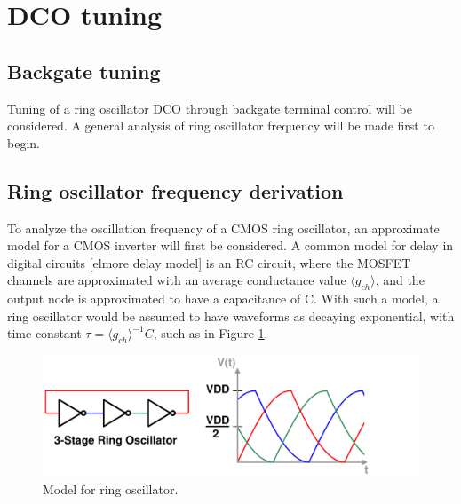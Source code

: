 	\FloatBarrier
	\flushleft
	\section{DCO tuning}
	\subsection{Backgate tuning}
		Tuning of a ring oscillator DCO through backgate terminal control will be considered. A general analysis of ring oscillator frequency will be made first to begin.

	\subsection{Ring oscillator frequency derivation}
		To analyze the oscillation frequency of a CMOS ring oscillator, an approximate model for a CMOS inverter will first be considered. A common model for delay in digital circuits [elmore delay model] is an RC circuit, where the MOSFET channels are approximated with an average conductance value $\langle g_{ch} \rangle$, and the output node is approximated to have a capacitance of C. With such a model, a ring oscillator would be assumed to have waveforms as decaying exponential, with time constant $\tau = \langle g_{ch} \rangle^{-1}C$, such as in Figure \ref{fig:rosc_rc}.
		\begin{figure}[htb!]
			\center\includegraphics[width=0.8\linewidth, angle=0]{figs/inv_waves3.pdf}
			\caption{Model for ring oscillator.}
			\label{fig:rosc_rc}
		\end{figure}

